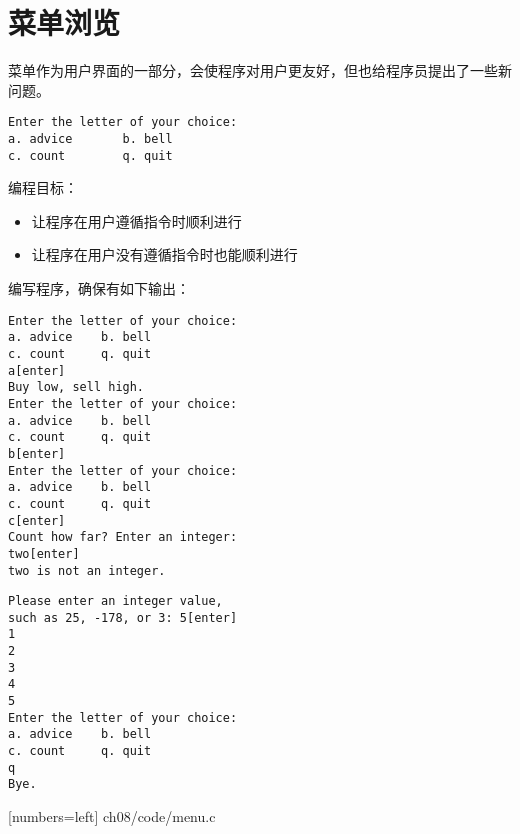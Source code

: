 \section{菜单浏览}
\begin{frame}[fragile]\ft{\secname}
菜单作为用户界面的一部分，会使程序对用户更友好，但也给程序员提出了一些新问题。
\begin{lstlisting}
Enter the letter of your choice:
a. advice       b. bell
c. count        q. quit   
\end{lstlisting}
编程目标：
\begin{itemize}
\item 让程序在用户遵循指令时顺利进行
\item 让程序在用户没有遵循指令时也能顺利进行
\end{itemize}
\end{frame}

\begin{frame}[fragile]\ft{\secname}
编写程序，确保有如下输出：
\end{frame}

\begin{frame}[fragile]\ft{\secname}
\begin{lstlisting}
Enter the letter of your choice:
a. advice    b. bell
c. count     q. quit
a[enter]
Buy low, sell high.
Enter the letter of your choice:
a. advice    b. bell
c. count     q. quit
b[enter]
Enter the letter of your choice:
a. advice    b. bell
c. count     q. quit
c[enter]
Count how far? Enter an integer:
two[enter]
two is not an integer.
\end{lstlisting}
\end{frame}

\begin{frame}[fragile]\ft{\secname}
\begin{lstlisting}
Please enter an integer value, 
such as 25, -178, or 3: 5[enter]
1
2
3
4
5
Enter the letter of your choice:
a. advice    b. bell
c. count     q. quit
q
Bye.
\end{lstlisting}
\end{frame}

\begin{frame}\ft{\secname}

[numbers=left]
{ch08/code/menu.c}
\end{frame}


